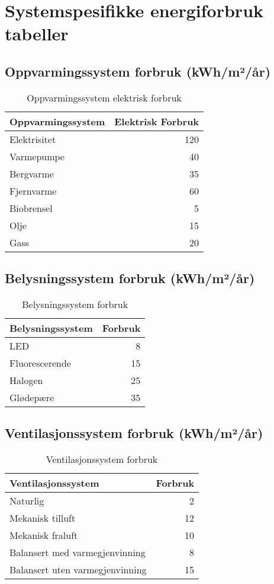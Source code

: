 \documentclass[12pt,a4paper]{article}
\begin{document}
\section{Systemspesifikke energiforbruk tabeller}

\subsection{Oppvarmingssystem forbruk (kWh/m²/år)}

\begin{table}[H]
\centering
\begin{tabular}{|l|r|}
\hline
\textbf{Oppvarmingssystem} & \textbf{Elektrisk Forbruk} \\
\hline
Elektrisitet & 120 \\
Varmepumpe & 40 \\
Bergvarme & 35 \\
Fjernvarme & 60 \\
Biobrensel & 5 \\
Olje & 15 \\
Gass & 20 \\
\hline
\end{tabular}
\caption{Oppvarmingssystem elektrisk forbruk}
\end{table}

\subsection{Belysningssystem forbruk (kWh/m²/år)}

\begin{table}[H]
\centering
\begin{tabular}{|l|r|}
\hline
\textbf{Belysningssystem} & \textbf{Forbruk} \\
\hline
LED & 8 \\
Fluorescerende & 15 \\
Halogen & 25 \\
Glødepære & 35 \\
\hline
\end{tabular}
\caption{Belysningssystem forbruk}
\end{table}

\subsection{Ventilasjonssystem forbruk (kWh/m²/år)}

\begin{table}[H]
\centering
\begin{tabular}{|l|r|}
\hline
\textbf{Ventilasjonssystem} & \textbf{Forbruk} \\
\hline
Naturlig & 2 \\
Mekanisk tilluft & 12 \\
Mekanisk fraluft & 10 \\
Balansert med varmegjenvinning & 8 \\
Balansert uten varmegjenvinning & 15 \\
\hline
\end{tabular}
\caption{Ventilasjonssystem forbruk}
\end{table}
\end{document}
